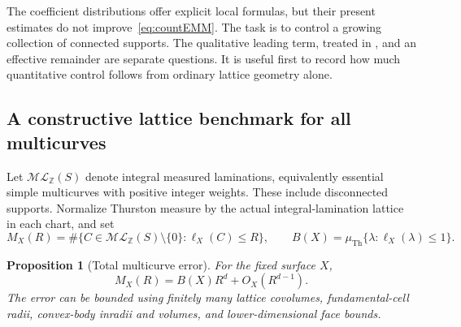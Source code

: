 \documentclass[11pt,a4paper]{article}
\numberwithin{equation}{section}
\newtheorem{proposition}[theorem]{Proposition}
\theoremstyle{definition}
\theoremstyle{remark}
\newcommand{\ZZ}{\mathbb Z}
\begin{document}
The coefficient distributions offer explicit local formulas, but
their present estimates do not improve~\eqref{eq:countEMM}.
The task is to control a growing collection of connected supports.
The qualitative leading term, treated in
\cite{MirzSimple,RivinSimpleAsymptotics}, and an effective remainder
are separate questions.  It is useful first to record how much
quantitative control follows from ordinary lattice geometry alone.

\subsection{A constructive lattice benchmark for all multicurves}
\label{subsec:countlattice}

Let $\mathcal{ML}_{\ZZ}(S)$ denote integral measured laminations,
equivalently essential simple multicurves with positive integer
weights.  These include disconnected supports.  Normalize Thurston
measure by the actual integral-lamination lattice in each chart, and
set
\[
 M_X(R)=\#\{C\in\mathcal{ML}_{\ZZ}(S)\setminus\{0\}:
                  \ell_X(C)\leq R\},\qquad
 B(X)=\mu_{\mathrm{Th}}\{\lambda:\ell_X(\lambda)\leq1\}.
\]

\begin{proposition}[Total multicurve error]
\label{prop:countall}
For the fixed surface $X$,
\begin{equation}
 \boxed{M_X(R)=B(X)R^d+O_X(R^{d-1}).}
 \label{eq:countall}
\end{equation}
The error can be bounded using finitely many lattice covolumes,
fundamental-cell radii, convex-body inradii and volumes, and
lower-dimensional face bounds.
\end{proposition}
\end{document}
